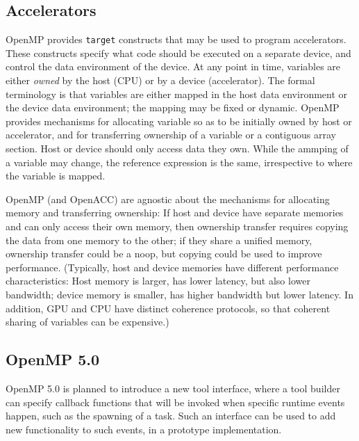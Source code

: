 	\subsection{Accelerators}
	OpenMP provides \texttt{target} constructs that may be used to program 
	accelerators. These constructs specify what code should be executed on a 
	separate device, and control the data environment of the device. At any 
	point in time, variables are either \emph{owned} by the host (CPU) or by a 
	device (accelerator). The formal terminology is that variables are either 
	mapped in the host data 
	environment or the device data environment; the mapping may be fixed or 
	dynamic. OpenMP provides mechanisms for 
	allocating variable so as to be initially
	owned by host or accelerator, and for transferring ownership of a variable 
	or a contiguous
	array section. Host or device should only access data they own. While the 
	ammping of a variable may change,
    the reference expression is the same, irrespective to where the 
	variable is mapped.
	
	OpenMP (and OpenACC) are agnostic about the mechanisms for allocating 
	memory and transferring ownership: If host and device have separate 
	memories 
	and can only access their own memory, then ownership transfer requires 
	copying 
	the data from one memory to the other; if they share a unified memory, 
	ownership transfer could be a 
	noop, but copying could be used to improve performance. (Typically, host 
	and device memories have different performance characteristics: Host memory 
	is larger, has lower latency, but also lower bandwidth; device memory is 
	smaller, has higher bandwidth but lower latency. In addition, GPU and CPU 
	have distinct coherence protocols, so that coherent sharing of variables 
	can be expensive.)
	
	\subsection{OpenMP 5.0}
	
	OpenMP 5.0 \cite{openmp5} is planned to introduce a new tool interface, 
	where a tool 
	builder can specify callback functions that will be invoked when specific 
	runtime events happen, such as the spawning of a task. Such an interface 
	can be used to add new functionality to such events, in a prototype 
	implementation.